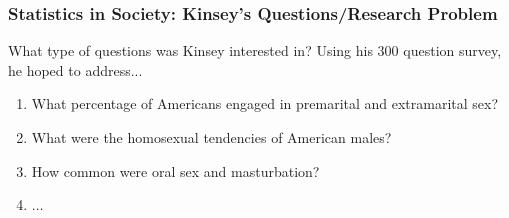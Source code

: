\documentclass[handout]{beamer}
\begin{document}
\begin{frame}
\frametitle{Statistics in Society: Kinsey's Questions/Research Problem}
What type of questions was Kinsey interested in?  Using his 300 question survey, he hoped to address...

\begin{enumerate}
\pause \item What percentage of Americans engaged in premarital and extramarital sex?
\pause \item What were the homosexual tendencies of American males?
\pause \item How common were oral sex and masturbation?
\item $\ldots$
\end{enumerate}
\end{frame}
\end{document}
